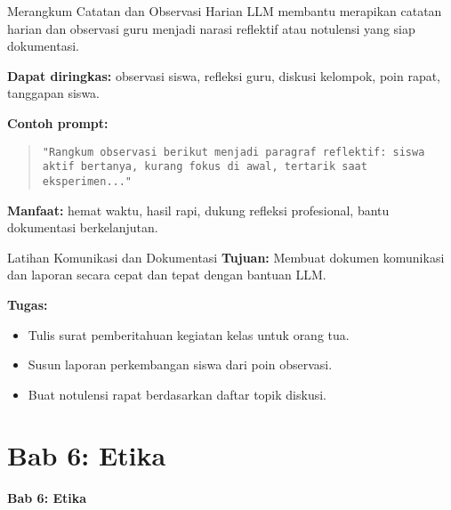 \documentclass[aspectratio=169, table]{beamer}
\begin{document}
\begin{frame}[fragile]{Merangkum Catatan dan Observasi Harian}
	\vspace{20pt}
	LLM membantu merapikan catatan harian dan observasi guru menjadi narasi reflektif atau notulensi yang siap dokumentasi.
	
	\vspace{10pt}
	\textbf{Dapat diringkas:}  
	observasi siswa, refleksi guru, diskusi kelompok, poin rapat, tanggapan siswa.
	
	\vspace{10pt}
	\textbf{Contoh prompt:}
	\begin{quote}
		\centering
		\texttt{"Rangkum observasi berikut menjadi paragraf reflektif: siswa aktif bertanya, kurang fokus di awal, tertarik saat eksperimen..."}
	\end{quote}
	
	\vspace{10pt}
	\textbf{Manfaat:}  
	hemat waktu, hasil rapi, dukung refleksi profesional, bantu dokumentasi berkelanjutan.
\end{frame}

\begin{frame}[fragile]{Latihan Komunikasi dan Dokumentasi}
	\vspace{20pt}
	\textbf{Tujuan:}  
	Membuat dokumen komunikasi dan laporan secara cepat dan tepat dengan bantuan LLM.
	
	\vspace{10pt}
	\textbf{Tugas:}
	\begin{itemize}
		\item Tulis surat pemberitahuan kegiatan kelas untuk orang tua.
		\item Susun laporan perkembangan siswa dari poin observasi.
		\item Buat notulensi rapat berdasarkan daftar topik diskusi.
	\end{itemize}
\end{frame}

\section{Bab 6: Etika}
\begin{frame}{\hfill}
	\centering
	\Huge{\textbf{Bab 6: Etika}}
\end{frame}	
	
\end{document}
